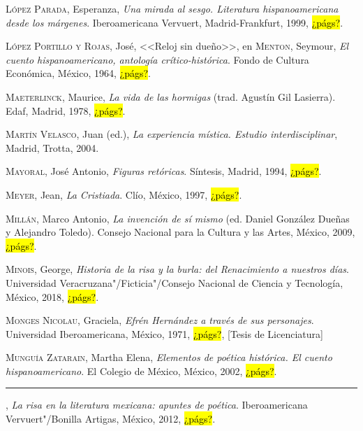 \documentclass[14pt,twoside,final]{extbook} %
\begin{document}
\textsc{López Parada}, Esperanza, \emph{Una mirada al sesgo. Literatura hispanoamericana desde los márgenes}. Iberoamericana Vervuert, Madrid-Frankfurt, 1999, \hl{¿págs?}.\label{bib:lopezparada1999}

\textsc{López Portillo y Rojas}, José, <<Reloj sin dueño>>, en \textsc{Menton}, Seymour, \emph{El cuento hispanoamericano, antología crítico-histórica}. Fondo de Cultura Económica, México, 1964, \hl{¿págs?}.\label{bib:lopezportillo1964}

\textsc{Maeterlinck}, Maurice, \emph{La vida de las hormigas} (trad. Agustín Gil Lasierra). Edaf, Madrid, 1978, \hl{¿págs?}.\label{bib:maeterlinck1978}

\textsc{Martín Velasco}, Juan (ed.), \emph{La experiencia mística. Estudio interdisciplinar}, Madrid, Trotta, 2004.\label{bib:martin2004}

\textsc{Mayoral}, José Antonio, \emph{Figuras retóricas}. Síntesis, Madrid, 1994, \hl{¿págs?}.\label{bib:mayoral1994}

\textsc{Meyer}, Jean, \emph{La Cristiada}. Clío, México, 1997,  \hl{¿págs?}.\label{bib:meyer1997}

\textsc{Millán}, Marco Antonio, \emph{La invención de sí mismo} (ed. Daniel González Dueñas y Alejandro Toledo). Consejo Nacional para la Cultura y las Artes, México, 2009, \hl{¿págs?}.\label{bib:millan2009}

\textsc{Minois}, George, \emph{Historia de la risa y la burla: del Renacimiento a nuestros días}. Universidad Veracruzana"/Ficticia"/Consejo Nacional de Ciencia y Tecnología, México, 2018, \hl{¿págs?}.\label{bib:minois2018}

\textsc{Monges Nicolau}, Graciela, \emph{Efrén Hernández a través de sus personajes}. Universidad Iberoamericana, México, 1971, \hl{¿págs?}, [Tesis de Licenciatura]\label{bib:monges1971}

\textsc{Munguía Zatarain}, Martha Elena, \emph{Elementos de poética histórica. El cuento hispanoamericano}. El Colegio de México, México, 2002, \hl{¿págs?}.\label{bib:munguia2002}

\rule{1cm}{0.4pt}, \emph{La risa en la literatura mexicana: apuntes de poética}. Iberoamericana Vervuert"/Bonilla Artigas, México, 2012, \hl{¿págs?}.\label{bib:munguia2012}
\end{document}
